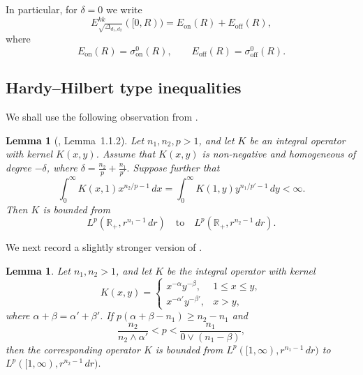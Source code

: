 \documentclass[12pt]{amsart}
\newcommand\Lapd{\Delta_{d_1, d_2}}
\newtheorem{lemma}[theorem]{Lemma}
\begin{document}
In particular, for $\delta=0$ we write
\begin{equation*}
E_{\sqrt{\Lapd}}^{kk}([0,R))
=
E_{\mathrm{on}}(R)
+
E_{\mathrm{off}}(R),
\end{equation*}
where
\begin{equation*}
E_{\mathrm{on}}(R)=\sigma_{\mathrm{on}}^0(R),
\qquad
E_{\mathrm{off}}(R)=\sigma_{\mathrm{off}}^0(R).
\end{equation*}




\subsection{Hardy--Hilbert type inequalities}
We shall use the following observation from \cite{HE_phd}.

\begin{lemma}[\cite{HE_phd}, Lemma~1.1.2]\label{He}
Let $n_1,n_2,p>1$, and let $K$ be an integral operator with kernel
$K(x,y)$. Assume that $K(x,y)$ is non-negative and homogeneous of degree
$-\delta$, where
\(\delta=\frac{n_2}{p}+\frac{n_1}{p'}.
\)
Suppose further that
\begin{equation}
    \int_0^\infty K(x,1)x^{n_2/p-1}\,dx
    =
    \int_0^\infty K(1,y)y^{n_1/p'-1}\,dy
    <\infty .
\end{equation}
Then $K$ is bounded from
\[
    L^p(\mathbb{R}_+,r^{n_1-1}\,dr)
    \quad\text{to}\quad
    L^p(\mathbb{R}_+,r^{n_2-1}\,dr).
\]
\end{lemma}

We next record a slightly stronger version of \cite[Lemma~2.6]{Nix}.

\begin{lemma}\label{Nix}
Let $n_1,n_2>1$, and let $K$ be the integral operator with kernel
\begin{equation}
    K(x,y)=
    \begin{cases}
       x^{-\alpha}y^{-\beta}, & 1\le x\le y,\\
       x^{-\alpha'}y^{-\beta'}, & x>y,
    \end{cases}
\end{equation}
where $\alpha+\beta=\alpha'+\beta'$. If
\( p(\alpha+\beta-n_1)\ge n_2-n_1
\)
and
\begin{equation*}
    \frac{n_2}{n_2\wedge \alpha'}
    < p <
    \frac{n_1}{0\vee(n_1-\beta)},
\end{equation*}
then the corresponding operator $K$ is bounded from
$L^p([1,\infty),r^{n_1-1}\,dr)$ to $
    L^p([1,\infty),r^{n_2-1}\,dr).$
\end{lemma}
\end{document}
